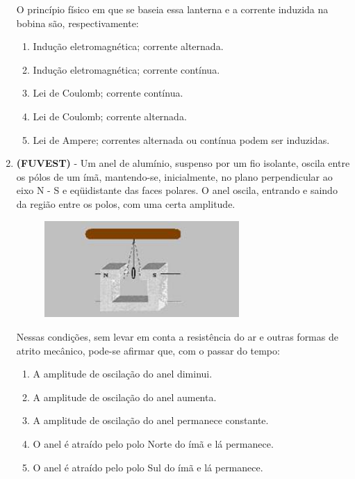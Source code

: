 \documentclass[12pt,letterpaper,fleqn]{article}
\begin{document}
\begin{enumerate}
        O princípio físico em que se baseia essa lanterna e a corrente induzida na bobina são, respectivamente:
        
        \begin{enumerate}
            \item Indução eletromagnética; corrente alternada.
            \item Indução eletromagnética; corrente contínua.
            \item Lei de Coulomb; corrente contínua.
            \item Lei de Coulomb; corrente alternada.
            \item Lei de Ampere; correntes alternada ou contínua podem ser induzidas.
        \end{enumerate}
        
        \item \textbf{(FUVEST)} -  Um anel de alumínio, suspenso por um fio isolante, oscila entre os pólos de um ímã, mantendo-se, inicialmente, no plano perpendicular ao eixo N - S e eqüidistante das faces polares. O anel oscila, entrando e saindo da região entre os polos, com uma certa amplitude.
        
        \begin{figure}[h]
            \centering
            \includegraphics[width=0.7\textwidth]{ex_5.jpg}
        \end{figure}
        
        Nessas condições, sem levar em conta a resistência do ar e outras formas de atrito mecânico, pode-se afirmar que, com o passar do tempo:
        
        \begin{enumerate}
            \item A amplitude de oscilação do anel diminui. 
            \item A amplitude de oscilação do anel aumenta.
            \item A amplitude de oscilação do anel permanece constante. 
            \item O anel é atraído pelo polo Norte do ímã e lá permanece.
            \item O anel é atraído pelo polo Sul do ímã e lá permanece.
        \end{enumerate}
        

\end{enumerate}
\end{document}
